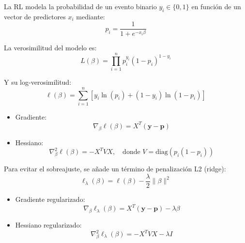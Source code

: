 \documentclass[12pt]{article}
\begin{document}
La RL modela la probabilidad de un evento binario $y_i \in \{0,1\}$ en función de un vector de predictores $x_i$ mediante:
\begin{equation}
    p_i = \frac{1}{1 + e^{-x_i \beta}}
\end{equation}

La verosimilitud del modelo es:
\begin{equation}
    L(\beta) = \prod_{i=1}^n p_i^{y_i}(1 - p_i)^{1 - y_i}
\end{equation}

Y su log-verosimilitud:
\begin{equation}
    \ell(\beta) = \sum_{i=1}^{n} \left[ y_i \ln(p_i) + (1 - y_i) \ln(1 - p_i) \right]
\end{equation}

\begin{itemize}
    \item Gradiente:
    \begin{equation}
        \nabla_{\beta} \ell(\beta) = X^T (\mathbf{y} - \mathbf{p})
    \end{equation}
    \item Hessiano:
    \begin{equation}
        \nabla^2_{\beta} \ell(\beta) = - X^T V X, \quad \text{donde } V = \text{diag}(p_i(1 - p_i))
    \end{equation}
\end{itemize}

Para evitar el sobreajuste, se añade un término de penalización L2 (ridge):
\begin{equation}
    \ell_{\lambda}(\beta) = \ell(\beta) - \frac{\lambda}{2} \|\beta\|^2
\end{equation}

\begin{itemize}
    \item Gradiente regularizado:
    \begin{equation}
        \nabla_{\beta} \ell_{\lambda}(\beta) = X^T (\mathbf{y} - \mathbf{p}) - \lambda \beta
    \end{equation}
    \item Hessiano regularizado:
    \begin{equation}
        \nabla^2_{\beta} \ell_{\lambda}(\beta) = - X^T V X - \lambda I
    \end{equation}
\end{itemize}
\end{document}
